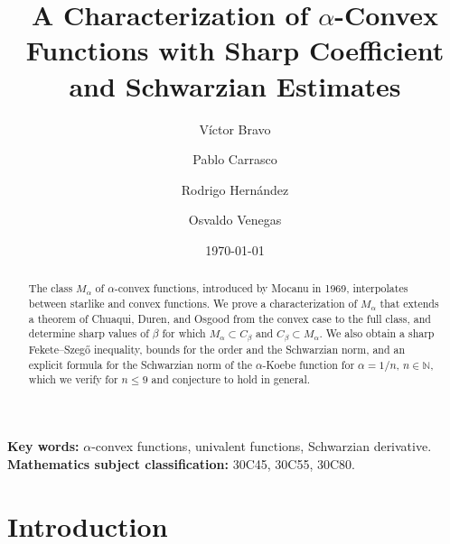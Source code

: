 \documentclass[reqno]{amsart}
\title[$\alpha$-Convex Functions]{A Characterization of $\alpha$-Convex Functions with Sharp Coefficient and Schwarzian Estimates}
\date{\today}
\author[V. Bravo]{V\'ictor Bravo}
\author[P. Carrasco]{Pablo Carrasco}
\author[R. Hern\'andez]{Rodrigo Hern\'andez}
\author[O. Venegas]{Osvaldo Venegas}
\theoremstyle{plain}
\theoremstyle{definition}
\begin{document}
\maketitle

\justifying

\begin{abstract}
The class $M_\alpha$ of $\alpha$-convex functions, introduced by Mocanu in 1969, interpolates between starlike and convex functions. We prove a characterization of $M_\alpha$ that extends a theorem of Chuaqui, Duren, and Osgood from the convex case to the full class, and determine sharp values of $\beta$ for which $M_\alpha \subset C_\beta$ and $C_\beta \subset M_\alpha$. We also obtain a sharp Fekete--Szeg\H{o} inequality, bounds for the order and the Schwarzian norm, and an explicit formula for the Schwarzian norm of the $\alpha$-Koebe function for $\alpha = 1/n$, $n \in \mathbb{N}$, which we verify for $n \leq 9$ and conjecture to hold in general.
\end{abstract}
\vspace{0.3cm}
\textbf{Key words:} $\alpha$-convex functions, univalent functions, Schwarzian derivative. \\

\textbf{Mathematics subject classification:} 30C45, 30C55, 30C80. \\

\section{Introduction}\label{sec1}
\end{document}
